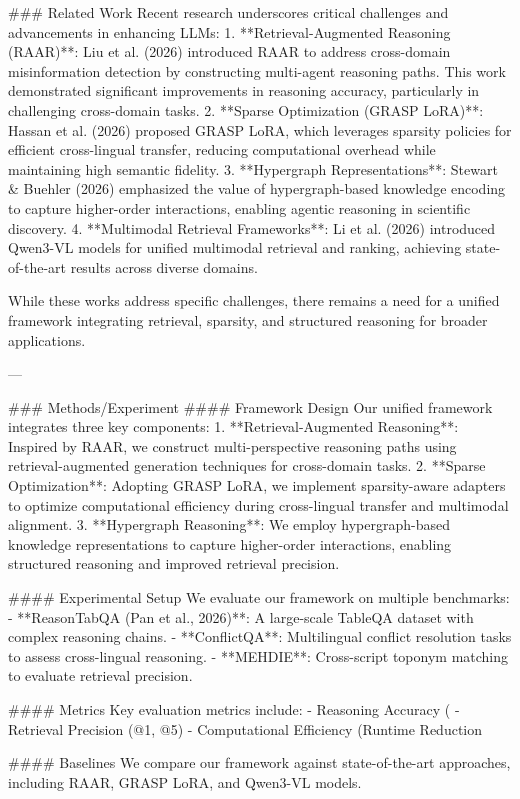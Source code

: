 ### Related Work
Recent research underscores critical challenges and advancements in enhancing LLMs:
1. **Retrieval-Augmented Reasoning (RAAR)**: Liu et al. (2026) introduced RAAR to address cross-domain misinformation detection by constructing multi-agent reasoning paths. This work demonstrated significant improvements in reasoning accuracy, particularly in challenging cross-domain tasks.
2. **Sparse Optimization (GRASP LoRA)**: Hassan et al. (2026) proposed GRASP LoRA, which leverages sparsity policies for efficient cross-lingual transfer, reducing computational overhead while maintaining high semantic fidelity.
3. **Hypergraph Representations**: Stewart & Buehler (2026) emphasized the value of hypergraph-based knowledge encoding to capture higher-order interactions, enabling agentic reasoning in scientific discovery.
4. **Multimodal Retrieval Frameworks**: Li et al. (2026) introduced Qwen3-VL models for unified multimodal retrieval and ranking, achieving state-of-the-art results across diverse domains.

While these works address specific challenges, there remains a need for a unified framework integrating retrieval, sparsity, and structured reasoning for broader applications.

---

### Methods/Experiment
#### Framework Design
Our unified framework integrates three key components:
1. **Retrieval-Augmented Reasoning**: Inspired by RAAR, we construct multi-perspective reasoning paths using retrieval-augmented generation techniques for cross-domain tasks.
2. **Sparse Optimization**: Adopting GRASP LoRA, we implement sparsity-aware adapters to optimize computational efficiency during cross-lingual transfer and multimodal alignment.
3. **Hypergraph Reasoning**: We employ hypergraph-based knowledge representations to capture higher-order interactions, enabling structured reasoning and improved retrieval precision.

#### Experimental Setup
We evaluate our framework on multiple benchmarks:
- **ReasonTabQA (Pan et al., 2026)**: A large-scale TableQA dataset with complex reasoning chains.
- **ConflictQA**: Multilingual conflict resolution tasks to assess cross-lingual reasoning.
- **MEHDIE**: Cross-script toponym matching to evaluate retrieval precision.

#### Metrics
Key evaluation metrics include:
- Reasoning Accuracy (%
- Retrieval Precision (@1, @5)
- Computational Efficiency (Runtime Reduction %

#### Baselines
We compare our framework against state-of-the-art approaches, including RAAR, GRASP LoRA, and Qwen3-VL models.

